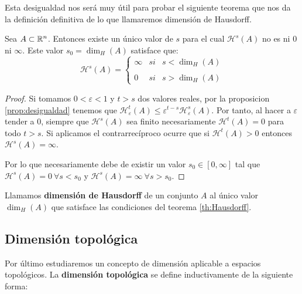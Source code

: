 Esta desigualdad nos será muy útil para probar el siguiente teorema que nos da la definición definitiva de lo que llamaremos dimensión de Hausdorff.

\begin{teorema}
\label{th:Hausdorff}
Sea $A\subset \mathbb{R}^n$. Entonces existe un único valor de $s$ para el cual $\mathcal{H}^s(A)$ no es ni $0$ ni $\infty$. Este valor $s_0=\dim_H(A)$ satisface que:
\begin{equation}
\mathcal H^s(A)= \left\{ \begin{array}{lcc}
             \infty &   si  & s < \dim_H(A) \\
             \\ 0 &  si & s > \dim_H(A) 
             \end{array}
   \right.
\end{equation}
\end{teorema} 
\begin{proof}
  Si tomamos $0<\varepsilon<1$ y $t>s$ dos valores reales, por la proposicion \ref{prop:desigualdad} tenemos que $\mathcal{H}_\varepsilon^t(A)\leq \varepsilon^{t-s}\mathcal{H}_\varepsilon^s(A)$. Por tanto, al hacer a $\varepsilon$ tender a $0$, siempre que $\mathcal{H}^s(A)$ sea finito necesariamente $\mathcal{H}^t(A)=0$ para todo $t>s$. Si aplicamos el contrarrecíproco ocurre que si $\mathcal{H}^t(A)>0$ entonces $\mathcal{H}^s(A)=\infty$.

  Por lo que necesariamente debe de existir un valor $s_0\in[0,\infty]$ tal que $\mathcal{H}^s(A)=0 \ \forall s<s_0$ y $\mathcal{H}^s(A)=\infty \ \forall s>s_0$.
\end{proof}
\begin{definicion}
Llamamos \textbf{dimensión de Hausdorff} de un conjunto $A$ al único valor $\dim_H(A)$ que satisface las condiciones del teorema \ref{th:Hausdorff}.
\end{definicion}

\subsection{Dimensión topológica}
\label{subsection:dim-topologica}

Por último estudiaremos un concepto de dimensión aplicable a espacios topológicos. La \textbf{dimensión topológica} se define inductivamente de la siguiente forma:

